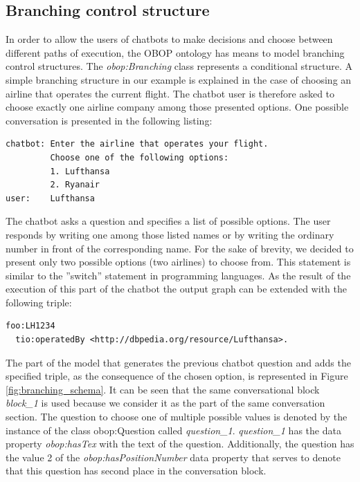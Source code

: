 \documentclass[runningheads]{llncs}
\begin{document}
\FloatBarrier
\subsection{Branching control structure}
In order to allow the users of chatbots to make decisions and choose between different paths of execution, the OBOP ontology has means to model branching control structures. The \textit{obop:Branching} class represents a conditional structure. A simple branching structure in our example is explained in the case of choosing an airline that operates the current flight. The chatbot user is therefore asked to choose exactly one airline company among those presented options.  
One possible conversation is presented in the following listing:
\begin{lstlisting}[basicstyle=\small,  xleftmargin=0.7cm ]
chatbot: Enter the airline that operates your flight.
         Choose one of the following options:
         1. Lufthansa
         2. Ryanair
user:    Lufthansa 
\end{lstlisting}
The chatbot asks a question and specifies a list of possible options. The user responds by writing one among those listed names or by writing the ordinary number in front of the corresponding name. For the sake of brevity, we decided to present only two possible options (two airlines) to choose from. This statement is similar to the ''switch'' statement in programming languages. As the result of the execution of this part of the chatbot the output graph can be extended with the following triple:
\begin{lstlisting}[basicstyle=\small,  xleftmargin=0.7cm ]
foo:LH1234
  tio:operatedBy <http://dbpedia.org/resource/Lufthansa>.
\end{lstlisting}
The part of the model that generates the previous chatbot question and adds the specified triple, as the consequence of the chosen option, is represented in Figure \ref{fig:branching_schema}. It can be seen that the same conversational block \textit{block\_1} is used because we consider it as the part of the same conversation section. The question to choose one of multiple possible values is denoted by the instance of the class obop:Question called \textit{question\_1}. \textit{question\_1} has the data property \textit{obop:hasTex} with the text of the question. Additionally, the question has the value 2 of the \textit{obop:hasPositionNumber} data property that serves to denote that this question has second place in the conversation block.         
\end{document}
